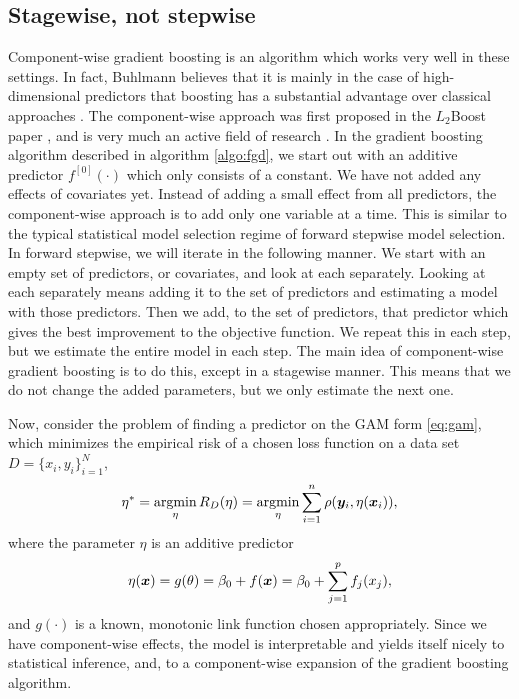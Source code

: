 \subsection{Stagewise, not stepwise}
Component-wise gradient boosting is an algorithm which works very well in these settings. In fact, Buhlmann believes that it is mainly in the case of high-dimensional predictors that boosting has a substantial advantage over classical approaches \citep{buhlmann2006}.
The component-wise approach was first proposed in the $L_2$Boost paper \citep{buhlmann-yu}, and is very much an active field of research \citep{buhlmann2006, mayr14a, mayr14b, mayr17}.
In the gradient boosting algorithm described in algorithm \eqref{algo:fgd}, we start out with an additive predictor $f^{[0]}(\cdot)$ which only consists of a constant. We have not added any effects of covariates yet. Instead of adding a small effect from all predictors, the component-wise approach is to add only one variable at a time. This is similar to the typical statistical model selection regime of forward stepwise model selection. In forward stepwise, we will iterate in the following manner. We start with an empty set of predictors, or covariates, and look at each separately. Looking at each separately means adding it to the set of predictors and estimating a model with those predictors. Then we add, to the set of predictors, that predictor which gives the best improvement to the objective function. We repeat this in each step, but we estimate the entire model in each step. The main idea of component-wise gradient boosting is to do this, except in a stagewise manner. This means that we do not change the added parameters, but we only estimate the next one.

Now, consider the problem of finding a predictor on the GAM form \eqref{eq:gam}, which minimizes the empirical risk of a chosen loss function on a data set $D=\{x_i,y_i\}_{i=1}^N$,
\begin{equation}\label{eq:argmin-eta}
    \eta^*=\operatorname*{argmin}_{\eta}R_D(\eta)=\operatorname*{argmin}_{\eta}\sum_{i=1}^n\rho(\bm{y}_i,\eta(\bm{x}_i)),
\end{equation}
where the parameter $\eta$ is an additive predictor
\begin{equation}
    \eta(\bm{x})=g(\theta)=\beta_0+f(\bm{x})=\beta_0+\sum_{j=1}^p f_j(x_j),
\end{equation}
and $g(\cdot)$ is a known, monotonic link function chosen appropriately. Since we have component-wise effects,
the model is interpretable and yields itself nicely to statistical inference, and, to a component-wise expansion of the gradient boosting
algorithm.


